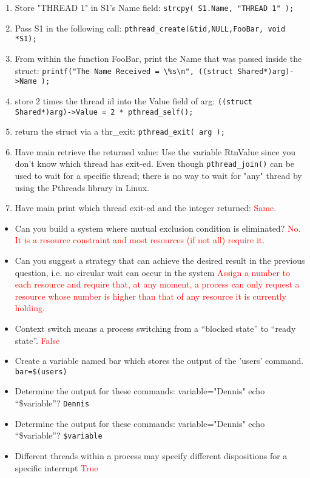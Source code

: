 \documentclass[10pt,landscape]{article}
\newcommand{\answer}[1]{\textcolor{red}{#1}}
\begin{document}
\begin{multicols}{4}
\begin{enumerate}
    \item Store "THREAD 1" in S1's Name field:  \verb$strcpy( S1.Name, "THREAD 1" );$
    \item Pass S1 in the following call:  \verb$pthread_create(&tid,NULL,FooBar, void *S1);$
    \item From within the function FooBar, print the Name that was passed inside the struct:  \verb$printf("The Name Received = \%s\n", ((struct Shared*)arg)->Name );$
    \item store 2 times the thread id into the Value field of arg:  \verb$((struct Shared*)arg)->Value = 2 * pthread_self();$
    \item return the struct via a thr\_exit: \verb$pthread_exit( arg );$
    \item Have main retrieve the returned value:  Use the variable RtnValue since you don't know which thread has exit-ed. Even though \verb$pthread_join()$ can be used to wait for a specific thread; there is no way to wait for "any" thread by using the Pthreads library in Linux.
    \item Have main print which thread exit-ed and the integer returned: \answer{Same.}
\end{enumerate}
\hfill
\begin{itemize}
    \item Can you build a system where mutual exclusion condition is eliminated?  \answer{No. It is a resource constraint and most resources (if not all) require it.}
    \item Can you suggest a strategy that can achieve the desired result in the previous question, i.e. no circular wait can occur in the system \answer{Assign a number to each resource and require that, at any moment, a process can only request a resource whose number is higher than that of any resource it is currently holding.}
    \item Context switch means a process switching from a ``blocked state'' to ``ready state''.  \answer{False}
    \item Create a variable named bar which stores the output of the 'users' command. \verb|bar=$(users)|
    \item Determine the output for these commands: variable="Dennis" echo ``\$variable''? \verb$Dennis$
    \item Determine the output for these commands: variable="Dennis" echo ``\$variable''? \verb|$variable|
    \item Different threads within a process may specify different dispositions for a specific interrupt \answer{True}

\end{itemize}
\end{multicols}
\end{document}
